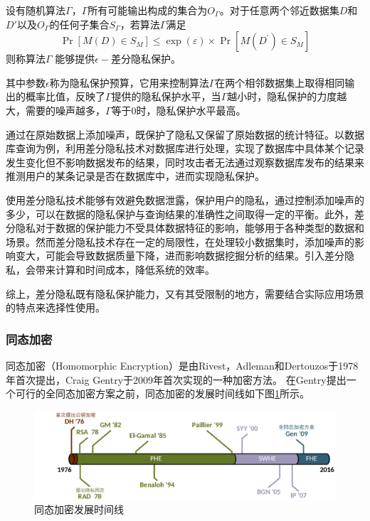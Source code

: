 \begin{definition}
	设有随机算法$ \varGamma $，$ \varGamma $所有可能输出构成的集合为$ O_{\varGamma} $。对于任意两个邻近数据集$ D $和$ D' $以及$ O_{\varGamma} $的任何子集合$ S_{\varGamma} $，若算法$ \varGamma $满足
	\begin{equation}
		\operatorname{Pr}\left[M(D) \in S_M\right] \leq \exp (\varepsilon) \times \operatorname{Pr}\left[M\left(D^{\prime}\right) \in S_M\right]
	\end{equation}
	则称算法$ \varGamma $ 能够提供$ \epsilon -$差分隐私保护。
\end{definition}

其中参数$ \epsilon $称为隐私保护预算，它用来控制算法$ \varGamma $在两个相邻数据集上取得相同输出的概率比值，反映了$ \varGamma $提供的隐私保护水平，当$ \varGamma $越小时，隐私保护的力度越大，需要的噪声越多，$ \varGamma $等于0时，隐私保护水平最高。

通过在原始数据上添加噪声，既保护了隐私又保留了原始数据的统计特征。以数据库查询为例，利用差分隐私技术对数据库进行处理，实现了数据库中具体某个记录发生变化但不影响数据发布的结果，同时攻击者无法通过观察数据库发布的结果来推测用户的某条记录是否在数据库中，进而实现隐私保护。

使用差分隐私技术能够有效避免数据泄露，保护用户的隐私，通过控制添加噪声的多少，可以在数据的隐私保护与查询结果的准确性之间取得一定的平衡。此外，差分隐私对于数据的保护能力不受具体数据特征的影响，能够用于各种类型的数据和场景。然而差分隐私技术存在一定的局限性，在处理较小数据集时，添加噪声的影响变大，可能会导致数据质量下降，进而影响数据挖掘分析的结果。引入差分隐私，会带来计算和时间成本，降低系统的效率。

综上，差分隐私既有隐私保护能力，又有其受限制的地方，需要结合实际应用场景的特点来选择性使用。

\subsubsection{同态加密}
同态加密（Homomorphic Encryption）是由Rivest，Adleman和Dertouzos\cite{rivest1978data}于1978年首次提出，Craig Gentry\cite{gentry2009fully}于2009年首次实现的一种加密方法。
在Gentry提出一个可行的全同态加密方案之前，同态加密的发展时间线\cite{acar2018survey}如下图\ref{timeline}所示。

\begin{figure}[htbp]
	\centering
	\includegraphics[scale=0.17]{img/timeline.png}
	\caption{同态加密发展时间线}
	\label{timeline}
\end{figure}

